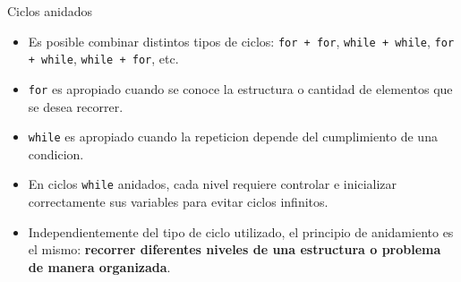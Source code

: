 \documentclass{beamer}
\begin{document}
    \begin{frame}[fragile, t]{Ciclos anidados}
        \begin{itemize}
            \item Es posible combinar distintos tipos de ciclos: \texttt{for + for}, \texttt{while + while}, \texttt{for + while}, \texttt{while + for}, etc.
            \item \texttt{for} es apropiado cuando se conoce la estructura o cantidad de elementos que se desea recorrer.
            \item \texttt{while} es apropiado cuando la repeticion depende del cumplimiento de una condicion.
            \item En ciclos \texttt{while} anidados, cada nivel requiere controlar e inicializar correctamente sus variables para evitar ciclos infinitos.
            \item Independientemente del tipo de ciclo utilizado, el principio de anidamiento es el mismo: \textbf{recorrer diferentes niveles de una estructura o problema de manera organizada}.
        \end{itemize}
    \end{frame}
\end{document}
